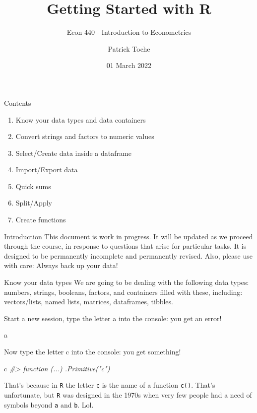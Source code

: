 \documentclass[
  11pt,
  ignorenonframetext,
  svgnames, handout, t]{beamer}
\title{Getting Started with R}
\subtitle{Econ 440 - Introduction to Econometrics}
\author{Patrick Toche}
\date{01 March 2022}
\newenvironment{Shaded}{\begin{snugshade}}{\end{snugshade}}
\newcommand{\CommentTok}[1]{\textcolor[rgb]{0.56,0.35,0.01}{\textit{#1}}}
\newcommand{\NormalTok}[1]{#1}
\providecommand{\tightlist}{%
  \setlength{\itemsep}{0pt}\setlength{\parskip}{0pt}}
\begin{document}
\frame{\titlepage}

\begin{frame}{Contents}
\protect\hypertarget{contents}{}
\begin{enumerate}
\tightlist
\item
  Know your data types and data containers
\item
  Convert strings and factors to numeric values
\item
  Select/Create data inside a dataframe
\item
  Import/Export data
\item
  Quick sums
\item
  Split/Apply
\item
  Create functions
\end{enumerate}
\end{frame}

\begin{frame}{Introduction}
\protect\hypertarget{introduction}{}
This document is work in progress. It will be updated as we proceed
through the course, in response to questions that arise for particular
tasks. It is designed to be permanently incomplete and permanently
revised. Also, please use with care: Always back up your data!
\end{frame}

\begin{frame}[fragile]{Know your data types}
\protect\hypertarget{know-your-data-types}{}
We are going to be dealing with the following data types: numbers,
strings, booleans, factors, and containers filled with these, including:
vectors/lists, named lists, matrices, dataframes, tibbles.

Start a new session, type the letter a into the console: you get an
error!

\footnotesize

\begin{Shaded}
\begin{Highlighting}[]
\NormalTok{a}
\end{Highlighting}
\end{Shaded}

\normalsize

Now type the letter c into the console: you get something!

\footnotesize

\begin{Shaded}
\begin{Highlighting}[]
\NormalTok{c}
\CommentTok{\#\textgreater{} function (...)  .Primitive("c")}
\end{Highlighting}
\end{Shaded}

\normalsize

That's because in \texttt{R} the letter \texttt{c} is the name of a
function \texttt{c()}. That's unfortunate, but \texttt{R} was designed
in the 1970s when very few people had a need of symbols beyond
\texttt{a} and \texttt{b}. Lol.
\end{frame}
\end{document}
